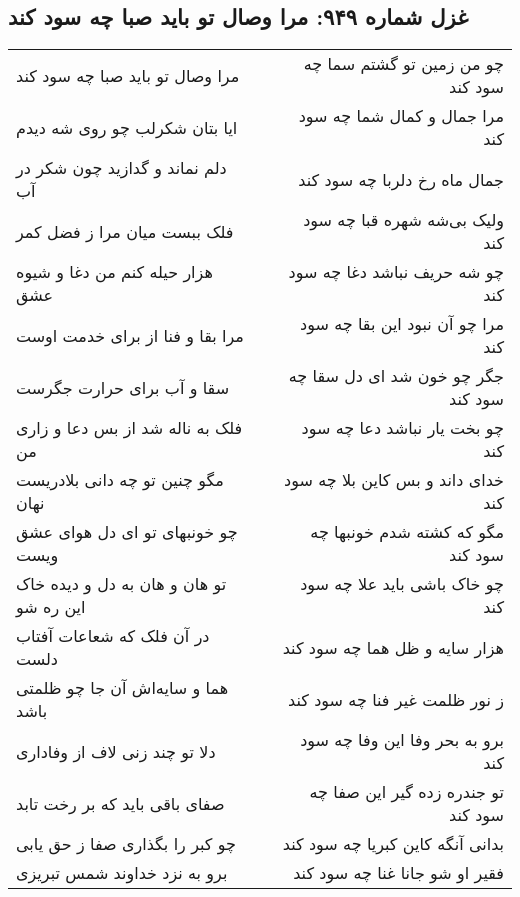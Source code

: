 \begin{center}
\section*{غزل شماره ۹۴۹: مرا وصال تو باید صبا چه سود کند}
\label{sec:0949}
\begin{longtable}{l p{0.5cm} r}
مرا وصال تو باید صبا چه سود کند
&&
چو من زمین تو گشتم سما چه سود کند
\\
ایا بتان شکرلب چو روی شه دیدم
&&
مرا جمال و کمال شما چه سود کند
\\
دلم نماند و گدازید چون شکر در آب
&&
جمال ماه رخ دلربا چه سود کند
\\
فلک ببست میان مرا ز فضل کمر
&&
ولیک بی‌شه شهره قبا چه سود کند
\\
هزار حیله کنم من دغا و شیوه عشق
&&
چو شه حریف نباشد دغا چه سود کند
\\
مرا بقا و فنا از برای خدمت اوست
&&
مرا چو آن نبود این بقا چه سود کند
\\
سقا و آب برای حرارت جگرست
&&
جگر چو خون شد ای دل سقا چه سود کند
\\
فلک به ناله شد از بس دعا و زاری من
&&
چو بخت یار نباشد دعا چه سود کند
\\
مگو چنین تو چه دانی بلادریست نهان
&&
خدای داند و بس کاین بلا چه سود کند
\\
چو خونبهای تو ای دل هوای عشق ویست
&&
مگو که کشته شدم خونبها چه سود کند
\\
تو هان و هان به دل و دیده خاک این ره شو
&&
چو خاک باشی باید علا چه سود کند
\\
در آن فلک که شعاعات آفتاب دلست
&&
هزار سایه و ظل هما چه سود کند
\\
هما و سایه‌اش آن جا چو ظلمتی باشد
&&
ز نور ظلمت غیر فنا چه سود کند
\\
دلا تو چند زنی لاف از وفاداری
&&
برو به بحر وفا این وفا چه سود کند
\\
صفای باقی باید که بر رخت تابد
&&
تو جندره زده گیر این صفا چه سود کند
\\
چو کبر را بگذاری صفا ز حق یابی
&&
بدانی آنگه کاین کبریا چه سود کند
\\
برو به نزد خداوند شمس تبریزی
&&
فقیر او شو جانا غنا چه سود کند
\\
\end{longtable}
\end{center}
